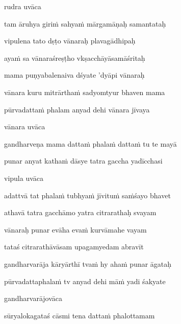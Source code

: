 rudra uvāca~{\dandab}\dontdisplaylinenum 

tam āruhya giri\.m sahya\.m mārgamāṇaḥ samantataḥ\thinspace{\danda} \dontdisplaylinenum

vipulena tato dṣṭo vānaraḥ plavagādhipaḥ \veg\dontdisplaylinenum

aya\.m sa vānaraśreṣṭho vkṣacchāyāsamāśritaḥ\thinspace{\dandab} \dontdisplaylinenum

mama puṇyabalenaiva dśyate 'dyāpi vānaraḥ \veg\dontdisplaylinenum

vānara kuru mitrārtha\.m sadyomtyur bhaven mama\thinspace{\dandab} \dontdisplaylinenum

pūrvadatta\.m phalam anyad dehi vānara jīvaya \veg\dontdisplaylinenum

vānara uvāca~{\dandab}\dontdisplaylinenum 

gandharveṇa mama datta\.m phala\.m datta\.m tu te mayā\thinspace{\danda} \dontdisplaylinenum

punar anyat katha\.m dāsye tatra gaccha yadīcchasi \veg\dontdisplaylinenum

vipula uvāca~{\dandab}\dontdisplaylinenum 

adattvā tat phala\.m tubhya\.m jīvitu\.m sa\.mśayo bhavet\thinspace{\danda} \dontdisplaylinenum

athavā tatra gacchāmo yatra citrarathaḥ svayam \veg\dontdisplaylinenum

vānaraḥ punar evāha eva\.m kurvāmahe vayam\thinspace{\dandab} \dontdisplaylinenum

tataś citrarathāvāsam upagamyedam abravīt \veg\dontdisplaylinenum

gandharvarāja kāryārthī tva\.m hy aha\.m punar āgataḥ\thinspace{\dandab} \dontdisplaylinenum

pūrvadattaphala\.m tv anyad dehi mā\.m yadi śakyate \veg\dontdisplaylinenum 

gandharvarājovāca\thinspace{\dandab} \dontdisplaylinenum

sūryalokagataś cāsmi tena datta\.m phalottamam \danda\dontdisplaylinenum

